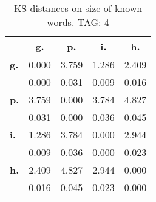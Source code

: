 \begin{table}[h!]
\begin{center}
\begin{tabular}{| l || c | c | c | c |}\hline
 & {\bf g.} & {\bf p.} & {\bf i.} & {\bf h.} \\\hline\hline
{\bf g.} & 0.000 & 3.759 & 1.286 & 2.409 \\
{\bf } & 0.000 & 0.031 & 0.009 & 0.016 \\\hline
{\bf p.} & 3.759 & 0.000 & 3.784 & 4.827 \\
{\bf } & 0.031 & 0.000 & 0.036 & 0.045 \\\hline
{\bf i.} & 1.286 & 3.784 & 0.000 & 2.944 \\
{\bf } & 0.009 & 0.036 & 0.000 & 0.023 \\\hline
{\bf h.} & 2.409 & 4.827 & 2.944 & 0.000 \\
{\bf } & 0.016 & 0.045 & 0.023 & 0.000 \\\hline
\end{tabular}
\caption{KS distances on size of known words. TAG: 4}
\end{center}
\end{table}